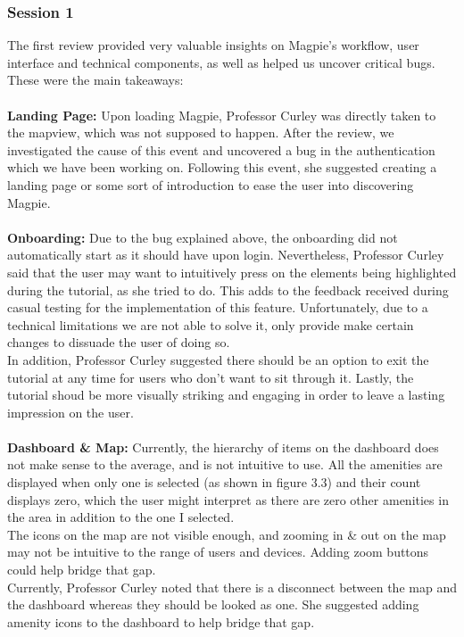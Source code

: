 \subsubsection{Session 1}
The first review provided very valuable insights on Magpie's workflow, user interface and technical components, as well as helped us uncover critical bugs. These were the main takeaways:\\ \\
\textbf{Landing Page: }
Upon loading Magpie, Professor Curley was directly taken to the mapview, which was not supposed to happen. After the review, we investigated the cause of this event and uncovered a bug in the authentication which we have been working on. Following this event, she suggested creating a landing page or some sort of introduction to ease the user into discovering Magpie.\\ \\
\textbf{Onboarding: }
Due to the bug explained above, the onboarding did not automatically start as it should have upon login. Nevertheless, Professor Curley said that the user may want to intuitively press on the elements being highlighted during the tutorial, as she tried to do. This adds to the feedback received during casual testing for the implementation of this feature. Unfortunately, due to a technical limitations we are not able to solve it, only provide make certain changes to dissuade the user of doing so.\\
In addition, Professor Curley suggested there should be an option to exit the tutorial at any time for users who don't want to sit through it. Lastly, the tutorial shoud be more visually striking and engaging in order to leave a lasting impression on the user.\\ \\
\textbf{Dashboard \& Map: }
Currently, the hierarchy of items on the dashboard does not make sense to the average, and is not intuitive to use. All the amenities are displayed when only one is selected (as shown in figure 3.3) and their count displays zero, which the user might interpret as there are zero other amenities in the area in addition to the one I selected.\\
The icons on the map are not visible enough, and zooming in \& out on the map may not be intuitive to the range of users and devices. Adding zoom buttons could help bridge that gap. \\
Currently, Professor Curley noted that there is a disconnect between the map and the dashboard whereas they should be looked as one. She suggested adding amenity icons to the dashboard to help bridge that gap.\\
